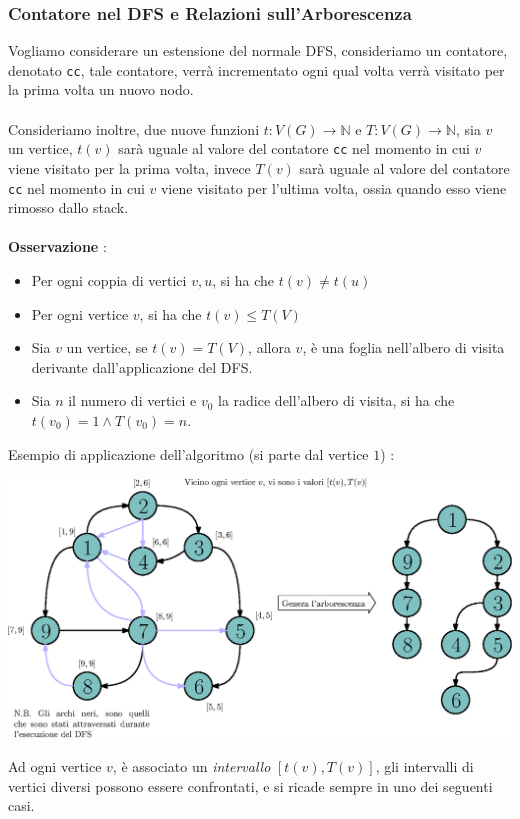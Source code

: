 \documentclass[12pt, letterpaper]{article}
\newcommand{\code}[1]{\colorbox{light-gray}{\texttt{#1}}}
\newcommand{\acc}{\\\hphantom{}\\}
\begin{document}
\subsubsection{Contatore nel DFS e Relazioni sull'Arborescenza}
Vogliamo considerare un estensione del normale DFS, consideriamo un contatore, denotato \code{cc}, tale contatore,
verrà incrementato ogni qual volta verrà visitato per la prima volta un nuovo nodo.\acc Consideriamo inoltre, due nuove
funzioni \(t:V(G)\rightarrow\mathbb{N}\) e \(T:V(G)\rightarrow\mathbb{N}\), sia \(v\) un vertice, \(t(v)\) sarà uguale al valore
del contatore \code{cc} nel momento in cui \(v\) viene visitato per la prima volta, invece \(T(v)\) sarà uguale al valore
del contatore \code{cc} nel momento in cui \(v\) viene visitato per l'ultima volta, ossia quando esso viene rimosso dallo stack.\acc
\textbf{Osservazione} : \begin{itemize}
    \item Per ogni coppia di vertici \(v,u\), si ha che \(t(v)\ne t(u)\)
    \item Per ogni vertice \(v\), si ha che \(t(v)\le T(V)\)
    \item Sia \(v\) un vertice, se \(t(v)=T(V)\), allora \(v\), è una foglia nell'albero di visita derivante dall'applicazione
          del DFS.
    \item Sia \(n\) il numero di vertici e \(v_0\) la radice dell'albero di visita, si ha che \(t(v_0)=1\land T(v_0)=n\).
\end{itemize}
Esempio di applicazione dell'algoritmo (si parte dal vertice \(1\)) : \begin{center}
    \includegraphics[width=1.05\textwidth ]{images/dfsContatore.eps}
\end{center}
Ad ogni vertice \(v\), è associato un \textit{intervallo} \([t(v),T(v)]\), gli intervalli di vertici diversi possono
essere confrontati, e si ricade sempre in uno dei seguenti casi.\acc
\end{document}
